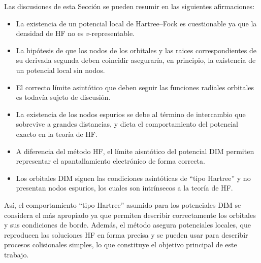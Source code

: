 Las discusiones de esta Sección se pueden resumir en las siguientes 
afirmaciones:
\begin{itemize}
\item La existencia de un potencial local de Hartree--Fock es 
cuestionable ya que la densidad de HF no es $v$-representable.
\item La hipótesis de que los nodos de los orbitales y las raices 
correspondientes de su derivada segunda deben coincidir aseguraría, en 
principio, la existencia de un potencial local sin nodos.
\item El correcto límite asintótico que deben seguir las funciones 
radiales orbitales es todavía sujeto de discusión. 
\item La existencia de los nodos espurios se debe al término de 
intercambio que sobrevive a grandes distancias, y dicta el 
comportamiento del potencial exacto en la teoría de HF.
\item A diferencia del método HF, el límite aisntótico del potencial DIM 
permiten representar el apantallamiento electrónico de forma correcta.
\item Los orbitales DIM siguen las condiciones asintóticas de ``tipo 
Hartree'' y no presentan nodos espurios, los cuales son intrínsecos a la 
teoría de HF.
\end{itemize}
Así, el comportamiento ``tipo Hartree'' asumido para los potenciales DIM 
se considera el más apropiado ya que permiten describir correctamente 
los orbitales y sus condiciones de borde. Además, el método asegura 
potenciales locales, que reproducen las soluciones HF en forma precisa
y se pueden usar para describir procesos colisionales simples, lo que 
constituye el objetivo principal de este trabajo.

